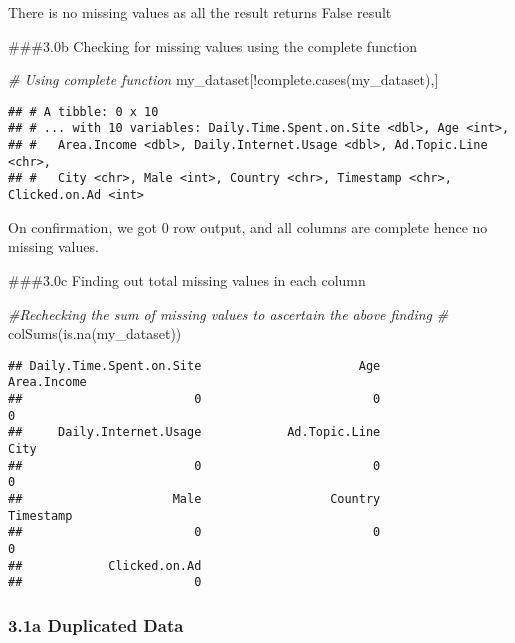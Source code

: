\documentclass[
]{article}
\newenvironment{Shaded}{\begin{snugshade}}{\end{snugshade}}
\newcommand{\CommentTok}[1]{\textcolor[rgb]{0.56,0.35,0.01}{\textit{#1}}}
\newcommand{\FunctionTok}[1]{\textcolor[rgb]{0.00,0.00,0.00}{#1}}
\newcommand{\NormalTok}[1]{#1}
\newcommand{\SpecialCharTok}[1]{\textcolor[rgb]{0.00,0.00,0.00}{#1}}
\begin{document}
There is no missing values as all the result returns False result

\#\#\#3.0b Checking for missing values using the complete function

\begin{Shaded}
\begin{Highlighting}[]
\CommentTok{\# Using complete function }
\NormalTok{my\_dataset[}\SpecialCharTok{!}\FunctionTok{complete.cases}\NormalTok{(my\_dataset),]}
\end{Highlighting}
\end{Shaded}

\begin{verbatim}
## # A tibble: 0 x 10
## # ... with 10 variables: Daily.Time.Spent.on.Site <dbl>, Age <int>,
## #   Area.Income <dbl>, Daily.Internet.Usage <dbl>, Ad.Topic.Line <chr>,
## #   City <chr>, Male <int>, Country <chr>, Timestamp <chr>, Clicked.on.Ad <int>
\end{verbatim}

On confirmation, we got 0 row output, and all columns are complete hence
no missing values.

\#\#\#3.0c Finding out total missing values in each column

\begin{Shaded}
\begin{Highlighting}[]
\CommentTok{\#Rechecking the sum of missing values to ascertain the above finding}
\CommentTok{\#}
\FunctionTok{colSums}\NormalTok{(}\FunctionTok{is.na}\NormalTok{(my\_dataset))}
\end{Highlighting}
\end{Shaded}

\begin{verbatim}
## Daily.Time.Spent.on.Site                      Age              Area.Income 
##                        0                        0                        0 
##     Daily.Internet.Usage            Ad.Topic.Line                     City 
##                        0                        0                        0 
##                     Male                  Country                Timestamp 
##                        0                        0                        0 
##            Clicked.on.Ad 
##                        0
\end{verbatim}

\hypertarget{a-duplicated-data}{%
\subsubsection{3.1a Duplicated Data}\label{a-duplicated-data}}
\end{document}
